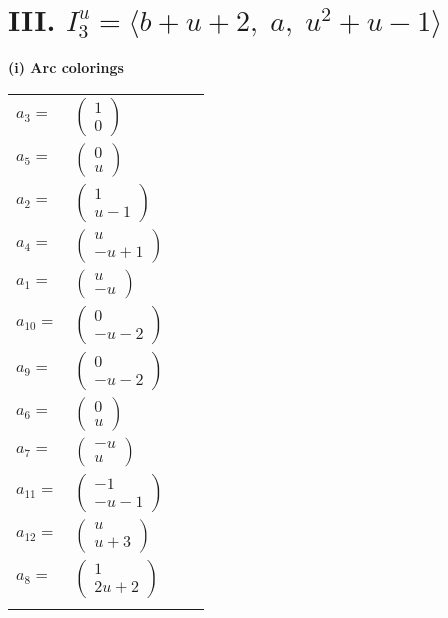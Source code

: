 \documentclass[1p]{elsarticle_modified}
\theoremstyle{definition}
\begin{document}
\centering \section*{III. $I^u_{3}= \langle b+u+2,\;a,\;u^2+u-1 \rangle$}
\flushleft \textbf{(i) Arc colorings}\\
\begin{tabular}{m{7pt} m{180pt} m{7pt} m{180pt} }
\flushright $a_{3}=$&$\begin{pmatrix}1\\0\end{pmatrix}$ \\
\flushright $a_{5}=$&$\begin{pmatrix}0\\u\end{pmatrix}$ \\
\flushright $a_{2}=$&$\begin{pmatrix}1\\u-1\end{pmatrix}$ \\
\flushright $a_{4}=$&$\begin{pmatrix}u\\- u+1\end{pmatrix}$ \\
\flushright $a_{1}=$&$\begin{pmatrix}u\\- u\end{pmatrix}$ \\
\flushright $a_{10}=$&$\begin{pmatrix}0\\- u-2\end{pmatrix}$ \\
\flushright $a_{9}=$&$\begin{pmatrix}0\\- u-2\end{pmatrix}$ \\
\flushright $a_{6}=$&$\begin{pmatrix}0\\u\end{pmatrix}$ \\
\flushright $a_{7}=$&$\begin{pmatrix}- u\\u\end{pmatrix}$ \\
\flushright $a_{11}=$&$\begin{pmatrix}-1\\- u-1\end{pmatrix}$ \\
\flushright $a_{12}=$&$\begin{pmatrix}u\\u+3\end{pmatrix}$ \\
\flushright $a_{8}=$&$\begin{pmatrix}1\\2 u+2\end{pmatrix}$\\&\end{tabular}
\end{document}
